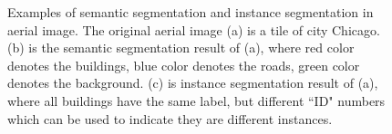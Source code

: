 \begin{figure}[!h]
{	}
    \caption[Examples of semantic and instance segmentation in aerial image]{Examples of semantic segmentation and instance segmentation in aerial image. The original aerial image (a) is a tile of city Chicago. (b) is the semantic segmentation result of (a), where red color denotes the buildings, blue color denotes the roads, green color denotes the background. (c) is instance segmentation result of (a), where all buildings have the same label, but different ``ID" numbers which can be used to indicate they are different instances.}
	\label{fig:arseg}
\end{figure}